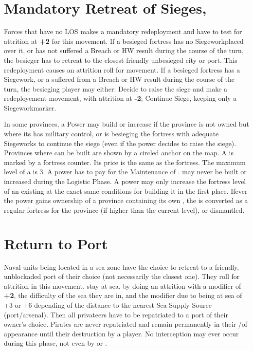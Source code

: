 \section{Mandatory Retreat of Sieges, \Presidios}

 Forces that have no LOS makes a mandatory redeployment
and have to test for attrition at {\bf +2} for this movement.
If a besieged fortress has no Siegework\faceplus placed over it, or has not
suffered a Breach or HW result during the course of the turn, the besieger has
to retreat to the closest friendly unbesieged city or port. This redeployment
causes an attrition roll for movement.
If a besieged fortress has a Siegework\faceplus, or a suffered from a Breach
or HW result during the course of the turn, the besieging player may either:
\bparag Decide to raise the siege and make a redeployement movement, with
attrition at {\bf -2};
\bparag Continue Siege, keeping only a Siegework\facemoins marker.

\label{chRedep:BuildPresidios}
In some provinces, a Power may build or increase \Presidios if the province is
not owned but where its has military control, or is besieging the fortress
with adequate Siegeworks to continue the siege (even if the power decides to
raise the siege).
\bparag Provinces where \Presidios can be built are shown by a circled anchor
on the map.
\bparag A \Presidio is marked by a fortress counter. Its price is the same as
the fortress. The maximum level of a \Presidio is 3.  A power has to pay for
the Maintenance of \Presidio.  \Presidios may never be built or increased
during the Logistic Phase.
\bparag A power may only increase the fortress level of an existing \Presidios
at the exact same conditions for building it in the first place.
\bparag Ifever the power gains ownership of a province containing its own
\Presidio, the \Presidio is converted as a regular fortress for the province
(if higher than the current level), or dismantled.



\section{Return to Port}

\aparag Naval units being located in a sea zone have the choice to
\bparag retreat to a friendly, unblockaded port of their choice (not
necessarily the closest one). They roll for attrition in this movement.
\bparag stay at sea, by doing an attrition with a modifier of {\bf +2}, the
difficulty of the sea they are in, and the modifier due to being at sea of +3
or +6 depending of the distance to the nearest Sea Supply Source
(port/arsenal).
\aparag Then all privateers have to be repatriated to a port of their owner's
choice.
\aparag Pirates are never repatriated and remain permanently in their
\STZ/\CTZ of appearance until their destruction by a player.
\aparag No interception may ever occur during this phase, not even by
\Presidios or \StraitFort.



